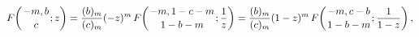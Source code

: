 \[\mathop{F\/}\nolimits\!\left({-m,b\atop c};z\right)=\frac{(b)_{m}}{(c)_{m}}(-z%
)^{m}\mathop{F\/}\nolimits\!\left({-m,1-c-m\atop 1-b-m};\frac{1}{z}\right)=%
\frac{(b)_{m}}{(c)_{m}}(1-z)^{m}\mathop{F\/}\nolimits\!\left({-m,c-b\atop 1-b-%
m};\frac{1}{1-z}\right),\]
